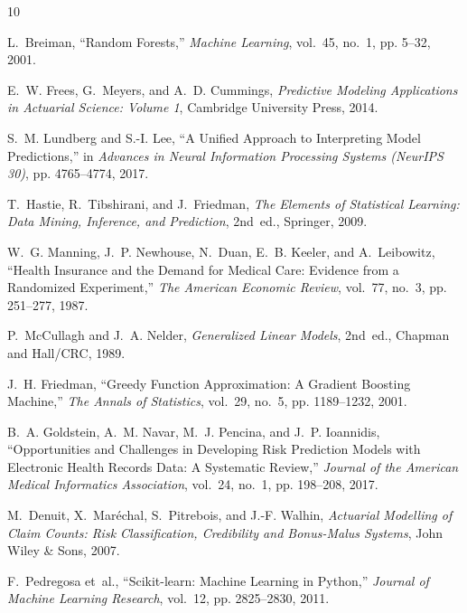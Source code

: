 \documentclass[12pt,a4paper]{report}
\begin{document}
\begin{thebibliography}{10}

L.~Breiman, ``Random Forests,'' \emph{Machine Learning}, vol.~45, no.~1, pp. 5--32, 2001.

E.~W. Frees, G.~Meyers, and A.~D. Cummings, \emph{Predictive Modeling Applications in Actuarial Science: Volume 1}, Cambridge University Press, 2014.

S.~M. Lundberg and S.-I. Lee, ``A Unified Approach to Interpreting Model Predictions,'' in \emph{Advances in Neural Information Processing Systems (NeurIPS 30)}, pp. 4765--4774, 2017.

T.~Hastie, R.~Tibshirani, and J.~Friedman, \emph{The Elements of Statistical Learning: Data Mining, Inference, and Prediction}, 2nd~ed., Springer, 2009.

W.~G. Manning, J.~P. Newhouse, N.~Duan, E.~B. Keeler, and A.~Leibowitz, ``Health Insurance and the Demand for Medical Care: Evidence from a Randomized Experiment,'' \emph{The American Economic Review}, vol.~77, no.~3, pp. 251--277, 1987.

P.~McCullagh and J.~A. Nelder, \emph{Generalized Linear Models}, 2nd~ed., Chapman and Hall/CRC, 1989.

J.~H. Friedman, ``Greedy Function Approximation: A Gradient Boosting Machine,'' \emph{The Annals of Statistics}, vol.~29, no.~5, pp. 1189--1232, 2001.

B.~A. Goldstein, A.~M. Navar, M.~J. Pencina, and J.~P. Ioannidis, ``Opportunities and Challenges in Developing Risk Prediction Models with Electronic Health Records Data: A Systematic Review,'' \emph{Journal of the American Medical Informatics Association}, vol.~24, no.~1, pp. 198--208, 2017.

M.~Denuit, X.~Mar{\'e}chal, S.~Pitrebois, and J.-F. Walhin, \emph{Actuarial Modelling of Claim Counts: Risk Classification, Credibility and Bonus-Malus Systems}, John Wiley \& Sons, 2007.

F.~Pedregosa et~al., ``Scikit-learn: Machine Learning in Python,'' \emph{Journal of Machine Learning Research}, vol.~12, pp. 2825--2830, 2011.

\end{thebibliography}
\end{document}

